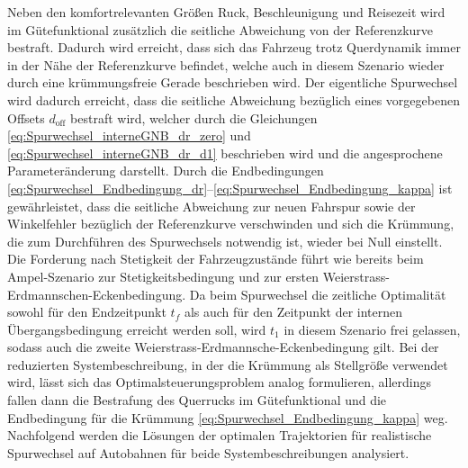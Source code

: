 Neben den komfortrelevanten Größen Ruck, Beschleunigung und Reisezeit wird im Gütefunktional zusätzlich die seitliche Abweichung von der Referenzkurve bestraft. Dadurch wird erreicht, dass sich das Fahrzeug trotz Querdynamik immer in der Nähe der Referenzkurve befindet, welche auch in diesem Szenario wieder durch eine krümmungsfreie Gerade beschrieben wird. Der eigentliche Spurwechsel wird dadurch erreicht, dass die seitliche Abweichung bezüglich eines vorgegebenen Offsets $d_{\textrm{off}}$ bestraft wird, welcher durch die Gleichungen \eqref{eq:Spurwechsel_interneGNB_dr_zero} und \eqref{eq:Spurwechsel_interneGNB_dr_d1} beschrieben wird und die angesprochene Parameteränderung darstellt. Durch die Endbedingungen \eqref{eq:Spurwechsel_Endbedingung_dr}--\eqref{eq:Spurwechsel_Endbedingung_kappa} ist gewährleistet, dass die seitliche Abweichung zur neuen Fahrspur sowie der Winkelfehler bezüglich der Referenzkurve verschwinden und sich die Krümmung, die zum Durchführen des Spurwechsels notwendig ist, wieder bei Null einstellt. Die Forderung nach Stetigkeit der Fahrzeugzustände führt wie bereits beim Ampel-Szenario zur Stetigkeitsbedingung und zur ersten Weierstrass-Erdmannschen-Eckenbedingung. Da beim Spurwechsel die zeitliche Optimalität sowohl für den Endzeitpunkt $t_f$ als auch für den Zeitpunkt der internen Übergangsbedingung erreicht werden soll, wird $t_1$ in diesem Szenario frei gelassen, sodass auch die zweite Weierstrass-Erdmannsche-Eckenbedingung gilt. Bei der reduzierten Systembeschreibung, in der die Krümmung als Stellgröße verwendet wird, lässt sich das Optimalsteuerungsproblem analog formulieren, allerdings fallen dann die Bestrafung des Querrucks im Gütefunktional und die Endbedingung für die Krümmung \eqref{eq:Spurwechsel_Endbedingung_kappa} weg. Nachfolgend werden die Lösungen der optimalen Trajektorien für realistische Spurwechsel auf Autobahnen für beide Systembeschreibungen analysiert.

